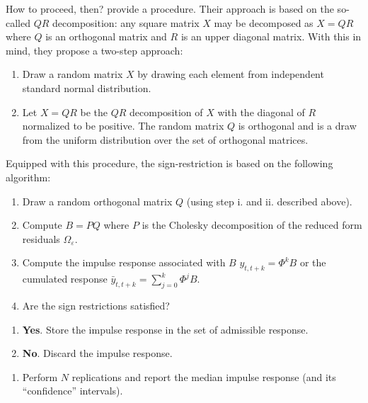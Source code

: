 \documentclass[
  12pt,
]{book}
\providecommand{\tightlist}{%
  \setlength{\itemsep}{0pt}\setlength{\parskip}{0pt}}
\theoremstyle{definition}
\theoremstyle{definition}
\theoremstyle{definition}
\theoremstyle{definition}
\theoremstyle{remark}
\begin{document}
How to proceed, then? \citet{Arias_et_al_2018} provide a procedure. Their approach is based on the so-called \(QR\) decomposition: any square matrix \(X\) may be decomposed as \(X=QR\) where \(Q\) is an orthogonal matrix and \(R\) is an upper diagonal matrix. With this in mind, they propose a two-step approach:

\begin{enumerate}
\def\labelenumi{\roman{enumi}.}
\tightlist
\item
  Draw a random matrix \(X\) by drawing each element from independent standard normal distribution.
\item
  Let \(X = QR\) be the \(QR\) decomposition of \(X\) with the diagonal of \(R\) normalized to be
  positive. The random matrix \(Q\) is orthogonal and is a draw from the uniform distribution over the set of orthogonal matrices.
\end{enumerate}

Equipped with this procedure, the sign-restriction is based on the following algorithm:

\begin{enumerate}
\def\labelenumi{\arabic{enumi}.}
\tightlist
\item
  Draw a random orthogonal matrix \(Q\) (using step i. and ii. described above).
\item
  Compute \(B = PQ\) where \(P\) is the Cholesky decomposition of the reduced form residuals \(\Omega_{\varepsilon}\).
\item
  Compute the impulse response associated with \(B\) \(y_{t,t+k}=\Phi^kB\) or the cumulated response \(\bar y_{t,t+k}=\sum_{j=0}^{k}\Phi^jB\).
\item
  Are the sign restrictions satisfied?
\end{enumerate}

\begin{enumerate}
\def\labelenumi{\alph{enumi}.}
\tightlist
\item
  \textbf{Yes}. Store the impulse response in the set of admissible response.
\item
  \textbf{No}. Discard the impulse response.
\end{enumerate}

\begin{enumerate}
\def\labelenumi{\arabic{enumi}.}
\setcounter{enumi}{4}
\tightlist
\item
  Perform \(N\) replications and report the median impulse response (and its ``confidence'' intervals).
\end{enumerate}
\end{document}
